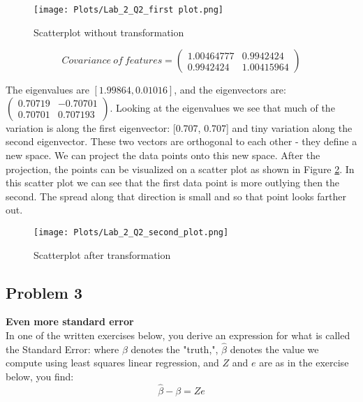 \documentclass[12pt]{article}%
\begin{document}
\begin{figure}
\texttt{[image: Plots/Lab\_2\_Q2\_first plot.png]}
\centering
\caption{Scatterplot without transformation}
\label{fig:Q2_first}
\centering
\end{figure}

\begin{equation*}
    Covariance\ of\ features = \begin{pmatrix}1.00464777 & 0.9942424\\0.9942424 & 1.00415964\end{pmatrix}
\end{equation*}

The eigenvalues are $[1.99864, 0.01016]$, and the eigenvectors are: $\begin{pmatrix}0.70719 & -0.70701\\0.70701 & 0.707193\end{pmatrix}$. Looking at the eigenvalues we see that much of the variation is along the first eigenvector: [0.707, 0.707] and tiny variation along the second eigenvector. These two vectors are orthogonal to each other - they define a new space. We can project the data points onto this new space. After the projection, the points can be visualized on a scatter plot as shown in Figure \ref{fig:Q2_second}. In this scatter plot we can see that the first data point is more outlying then the second. The spread along that direction is small and so that point looks farther out.

\begin{figure}
\texttt{[image: Plots/Lab\_2\_Q2\_second\_plot.png]}
\centering
\caption{Scatterplot after transformation}
\label{fig:Q2_second}
\centering
\end{figure}




\subsection{Problem 3}

\textbf{Even more standard error}\\

In one of the written exercises below, you derive an expression for what is called the Standard Error: where $\beta$ denotes the "truth,", $\hat{\beta}$ denotes the value we compute using least squares linear regression, and $Z$ and $e$ are as in the exercise below, you find:
\begin{equation*}
    \hat{\beta} - \beta = Ze
\end{equation*}
\end{document}
